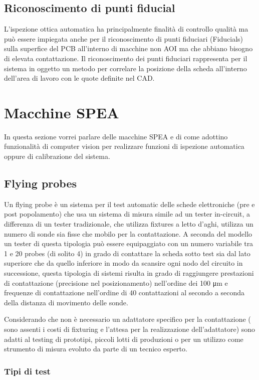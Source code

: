\subsection{Riconoscimento di punti fiducial}
L’ispezione ottica automatica ha principalmente finalità di controllo qualità ma può essere impiegata
anche per il riconoscimento di punti fiduciari (Fiducials) sulla superfice del PCB all’interno di macchine non AOI ma che abbiano bisogno di elevata contattazione. Il riconoscimento dei punti fiduciari rappresenta
per il sistema in oggetto un metodo per correlare la posizione della scheda all’interno dell’area di lavoro
con le quote definite nel CAD.

\section{Macchine SPEA}
In questa sezione vorrei parlare delle macchine SPEA e di come adottino
funzionalità di computer vision per realizzare funzioni di ispezione automatica
oppure di calibrazione del sistema.
\subsection{Flying probes}
Un flying probe è un sistema per il test automatic delle schede elettroniche (pre e post popolamento) che 
usa un sistema di misura simile ad un tester in-circuit, a differenza di un tester tradizionale, che utilizza fixtures a letto d’aghi, utilizza un numero di sonde sia fisse che mobilo per la contattazione. 
A seconda del modello un tester di questa tipologia può essere equipaggiato con un numero variabile tra 
1 e 20 probes (di solito 4) in grado di contattare la scheda sotto test sia dal lato superiore che da quello inferiore in modo da scansire ogni nodo del circuito in successione, questa tipologia di sistemi risulta in grado di raggiungere prestazioni di contattazione (precisione nel posizionamento) nell’ordine dei  100 μm e frequenze di contattazione nell’ordine di 40 contattazioni al secondo a seconda della distanza di movimento delle sonde. 

Considerando che non è necessario un adattatore specifico per la contattazione ( sono assenti i costi di 
fixturing e l’attesa per la realizzazione dell’adattatore) sono adatti al testing di prototipi, piccoli lotti di produzioni o per un utilizzo come strumento di misura evoluto da parte di un tecnico esperto.  

\subsubsection{Tipi di test}

